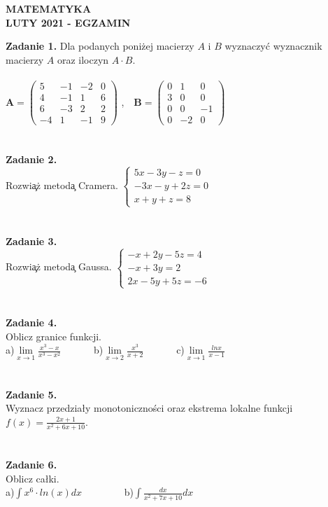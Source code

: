 \documentclass{report}
\begin{document}
\begin{center}
\textbf{MATEMATYKA \\LUTY 2021 - EGZAMIN}
\end{center}
\textbf{Zadanie 1.} 
Dla podanych poniżej macierzy $A$ i $B$ wyznaczyć wyznacznik macierzy $A$ oraz iloczyn $A\cdot B$.
\\\\
$
\mathbf{A} =
\left( \begin{array}{cccc}
5 & -1& -2 & 0\\
4 & -1&1 & 6\\
6 & -3& 2 & 2\\
-4 & 1 & -1 & 9 
\end{array} \right)
$ ,\ \ 
$
\mathbf{B} =
\left( \begin{array}{ccc}
0 & 1& 0\\
3 & 0& 0\\
0 & 0& -1\\
0 & -2& 0
\end{array} \right)
$
\\\\\\\textbf{Zadanie 2.} 
\\Rozwi\c{a}\.z metod\c{a} Cramera. 
$
\left\{ \begin{array}{ll}
5x-3y-z=0\\
-3x-y+2z=0\\
x+y+z=8
\end{array} \right.
$
\\\\\\\textbf{Zadanie 3.} 
\\Rozwi\c{a}\.z metod\c{a} Gaussa. 
$
\left\{ \begin{array}{ll}
-x+2y-5z=4\\
-x+3y=2\\
2x-5y+5z=-6
\end{array} \right.
$
\\\\\\\textbf{Zadanie 4.}
\\Oblicz granice funkcji.
\\a)$\lim\limits_{x\to 1}\frac{x^3-x}{x^3-x^2}$
\ \ \ \ \ \  b)$\lim\limits_{x\to 2}\frac{x^3}{x+2}$
\ \ \ \ \ \ c)$\lim\limits_{x\to 1} \frac{lnx}{x-1}$
\\\\\\\textbf{Zadanie 5.}
\\Wyznacz przedziały monotoniczności oraz ekstrema lokalne funkcji $f(x)=\frac{2x+1}{x^2+6x+10}$.
\\\\\\\textbf{Zadanie 6.}
\\Oblicz całki. 
\\a)$\int x^6\cdot ln(x) dx$ \ \ \ \ \ \ \ \ b)$\int \frac{dx}{x^2+7x+10} dx$
\end{document}
